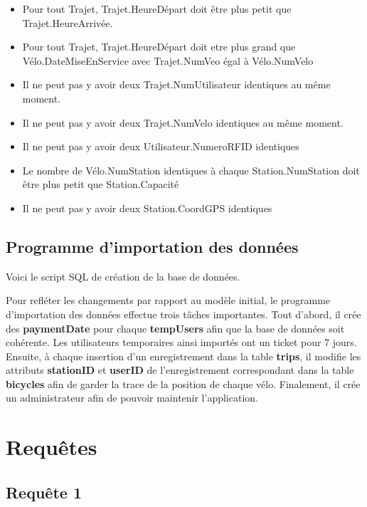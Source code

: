 \documentclass[a4paper,11pt]{report}
\begin{document}
\begin{itemize}
\item Pour tout Trajet, Trajet.HeureDépart doit être plus petit que Trajet.HeureArrivée.
\item Pour tout Trajet, Trajet.HeureDépart doit etre plus grand que Vélo.DateMiseEnService avec Trajet.NumVeo égal à Vélo.NumVelo
\item Il ne peut pas y avoir deux Trajet.NumUtilisateur identiques au même moment.
\item Il ne peut pas y avoir deux Trajet.NumVelo identiques au même moment.
\item Il ne peut pas y avoir deux Utilisateur.NumeroRFID identiques
\item Le nombre de Vélo.NumStation identiques à chaque Station.NumStation doit être plus petit que Station.Capacité
\item Il ne peut pas y avoir deux Station.CoordGPS identiques

\end{itemize}

\section{Programme d'importation des données}

Voici le script SQL de création de la base de données.



Pour refléter les changements par rapport au modèle initial, le programme d'importation des données effectue trois tâches importantes.
Tout d'abord, il crée des \textbf{paymentDate} pour chaque \textbf{tempUsers} afin que la base de données soit cohérente. Les utilisateurs temporaires ainsi importés ont un ticket pour 7 jours.
Ensuite, à chaque insertion d'un enregistrement dans la table \textbf{trips}, il modifie les attributs \textbf{stationID} et \textbf{userID} de l'enregistrement correspondant dans la table \textbf{bicycles} afin de garder la trace de la position de chaque vélo.
Finalement, il crée un administrateur afin de pouvoir maintenir l'application.

\chapter{Requêtes}

\section{Requ\^ete 1}
\end{document}
